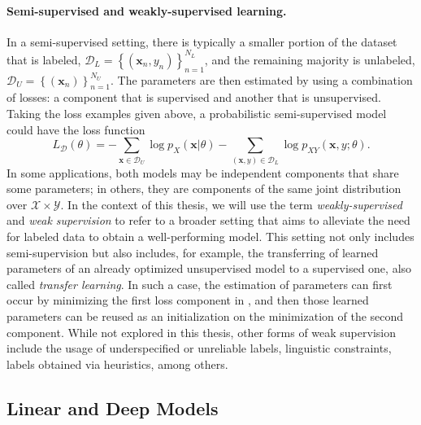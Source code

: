 \paragraph*{Semi-supervised and weakly-supervised learning.} In a
semi-supervised setting, there is typically a smaller portion of the
dataset that is labeled,
$\mathcal{D}_{L}=
    \left\{(\bm{x}_n,y_n)\right\}_{n=1}^{N_{L}}$,
and the remaining majority is unlabeled,
$\mathcal{D}_{U}=
    \left\{(\bm{x}_n)\right\}_{n=1}^{N_{U}}$.
The parameters are then estimated by using a combination of losses: a
component that is supervised and another that is unsupervised.
Taking the loss examples given above, a probabilistic semi-supervised model could
have the loss function
%
\begin{equation}
    L_{\mathcal D}\left(\theta\right)=
    -\sum_{\bm{x}\in\mathcal{D}_U}
    \log p_{X}\left(\bm{x}|\theta\right)
    -\sum_{(\bm{x},y)\in\mathcal{D}_L}
    \log p_{XY}\left(\bm{x}, y;\theta\right).
    \label{eq:semisup}
\end{equation}
%
In some applications,
both models may be independent components that share some
parameters; in others, they are components of the same joint distribution over
$\mathcal{X}\times\mathcal{Y}$.
In the context of this
thesis, we will use the term \textit{weakly-supervised} and
\textit{weak supervision} to refer to a broader setting that aims to
alleviate the need for labeled data to obtain a well-performing
model. This setting not only includes semi-supervision but also
includes, for example, the transferring of learned parameters of an
already optimized unsupervised model to a supervised one, also called
\textit{transfer learning}. In such a case, the estimation of
parameters can first occur by minimizing the first loss component in
, and then those learned parameters can be reused
as an initialization on the minimization of the second component.
While not explored in this thesis, other forms of weak supervision
include the usage of underspecified or unreliable labels, linguistic
constraints, labels obtained via heuristics, among others.

\subsection{Linear and Deep Models}

